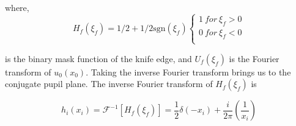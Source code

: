 \noindent where,
\[ 
H_f(\xi_f)= 1/2+1/2\mbox{sgn}(\xi_f) \left\{
\begin{array}{ll}
      1 \: for \: \xi_f >0\\
      0 \: for \: \xi_f <0\\
      
\end{array} 
\right. 
\]

\noindent is the binary mask function of the knife edge, and $U_f(\xi_f)$ is the Fourier transform of $u_0(x_0)$. Taking the inverse Fourier transform brings us to the conjugate pupil plane. The inverse Fourier transform of $H_f(\xi_f)$ is


\begin{equation}
    h_i(x_i)= \mathcal{F}^{-1}[H_f(\xi_f)] =
    \frac{1}{2} \delta(-x_i) + \frac{i}{2\pi} \left(\frac{1}{x_i}\right)
\label{delta}
\end{equation}




